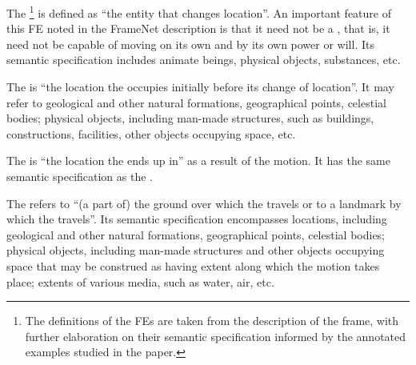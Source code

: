 \documentclass[output=paper,colorlinks,citecolor=brown]{langscibook}
\begin{document}
The \footnote{The definitions of the FEs are taken from the description of the  frame, with further elaboration on their semantic specification informed by the annotated examples studied in the paper.} is defined as ``the entity that changes location''. An important feature of this FE noted in the FrameNet description is that it need not be a , that is, it need not be capable of moving on its own and by its own power or will.
 Its semantic specification includes animate beings, physical objects, substances, etc.

The  is ``the location the  occupies initially before its change of location''. It may refer to geological and other natural formations, geographical points, celestial bodies; physical objects, including man-made structures, such as buildings, constructions, facilities, other objects occupying space, etc.



The  is ``the location the  ends up in'' as a result of the motion. It has the same semantic specification as the .

The  refers to ``(a part of) the ground over which the  travels or to a landmark by which the  travels''. Its semantic specification encompasses locations, including geological and other natural formations, geographical points, celestial bodies; physical objects, including man-made structures and other objects occupying space that may be construed as having extent along which the motion takes place; extents of various media, such as water, air, etc. 
\end{document}
